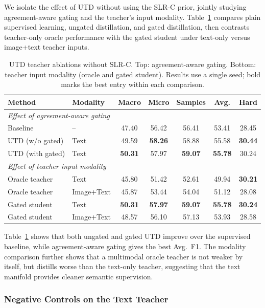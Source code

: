 We isolate the effect of UTD without using the SLR-C prior, jointly studying agreement-aware gating and the teacher's input modality. Table~\ref{tab:utd_ablation} compares plain supervised learning, ungated distillation, and gated distillation, then contrasts teacher-only oracle performance with the gated student under text-only versus image+text teacher inputs.
\begin{table}[htbp]
\centering
\small
\caption{UTD teacher ablations without SLR-C. Top: agreement-aware gating. Bottom: teacher input modality (oracle and gated student). Results use a single seed; bold marks the best entry within each comparison.}
\label{tab:utd_ablation}
\setlength{\tabcolsep}{4pt}
\begin{tabular}{llccccc}
\hline
Method & Modality & Macro & Micro & Samples & Avg. & Hard \\
\hline
\multicolumn{7}{l}{\textit{Effect of agreement-aware gating}} \\
Baseline & -- & 47.40 & 56.42 & 56.41 & 53.41 & 28.45 \\
UTD (w/o gated) & Text & 49.59 & \textbf{58.26} & 58.88 & 55.58 & \textbf{30.44} \\
UTD (with gated) & Text & \textbf{50.31} & 57.97 & \textbf{59.07} & \textbf{55.78} & 30.24 \\
\hline
\multicolumn{7}{l}{\textit{Effect of teacher input modality}} \\
Oracle teacher & Text & 45.80 & 51.42 & 52.61 & 49.94 & \textbf{30.21} \\
Oracle teacher & Image+Text & 45.87 & 53.44 & 54.04 & 51.12 & 28.08 \\
Gated student & Text & \textbf{50.31} & \textbf{57.97} & \textbf{59.07} & \textbf{55.78} & \textbf{30.24} \\
Gated student & Image+Text & 48.57 & 56.10 & 57.13 & 53.93 & 28.58 \\
\hline
\end{tabular}
\end{table}

Table~\ref{tab:utd_ablation} shows that both ungated and gated UTD improve over the supervised baseline, while agreement-aware gating gives the best Avg.\ F1. The modality comparison further shows that a multimodal oracle teacher is not weaker by itself, but distills worse than the text-only teacher, suggesting that the text manifold provides cleaner semantic supervision.

\fi

\subsubsection{Negative Controls on the Text Teacher}

